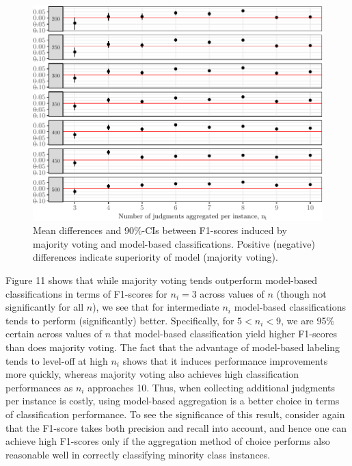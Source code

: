 \documentclass[12pt,]{article}
\begin{document}
\begin{figure}[H]

{\centering \includegraphics{licht_2019_evaluating_crowdsourced_elite_critique_codings_files/figure-latex/sim_bba_mv_f1_differences-1} 

}

\caption{Mean differences and 90\%-CIs between F1-scores induced by majority voting and model-based classifications. Positive (negative) differences indicate superiority of model (majority voting).}\label{fig:sim_bba_mv_f1_differences}
\end{figure}

Figure 11 shows that while majority voting tends outperform model-based
classifications in terms of F1-scores for \(n_i = 3\) across values of
\(n\) (though not significantly for all \(n\)), we see that for
intermediate \(n_i\) model-based classifications tends to perform
(significantly) better. Specifically, for \(5 < n_i < 9\), we are 95\%
certain across values of \(n\) that model-based classification yield
higher F1-scores than does majority voting. The fact that the advantage
of model-based labeling tends to level-off at high \(n_i\) shows that it
induces performance improvements more quickly, whereas majority voting
also achieves high classification performances as \(n_i\) approaches 10.
Thus, when collecting additional judgments per instance is costly, using
model-based aggregation is a better choice in terms of classification
performance. To see the significance of this result, consider again that
the F1-score takes both precision and recall into account, and hence one
can achieve high F1-scores only if the aggregation method of choice
performs also reasonable well in correctly classifying minority class
instances.
\end{document}
